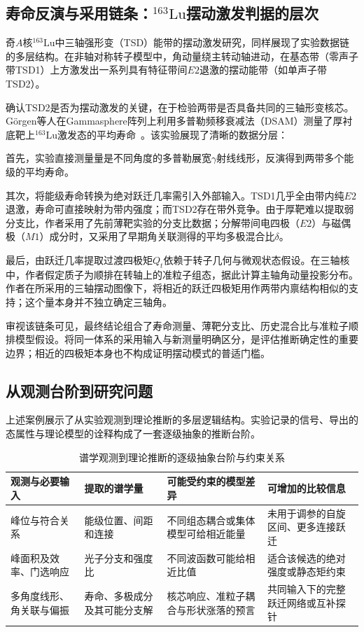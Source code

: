 \subsection{寿命反演与采用链条：\texorpdfstring{$^{163}\mathrm{Lu}$}{163Lu}摆动激发判据的层次}\label{sec:1-1-2}

奇$A$核$^{163}\mathrm{Lu}$中三轴强形变（TSD）能带的摆动激发研究，同样展现了实验数据链的多层结构。在非轴对称转子模型中，角动量绕主转动轴进动，在基态带（零声子带TSD1）上方激发出一系列具有特征带间$E2$退激的摆动能带（如单声子带TSD2）。

确认TSD2是否为摆动激发的关键，在于检验两带是否具备共同的三轴形变核芯。G\"orgen等人在Gammasphere阵列上利用多普勒频移衰减法（DSAM）测量了厚衬底靶上$^{163}\mathrm{Lu}$激发态的平均寿命~\cite{campaign-g07-gorgen-2004-163lu-quadrupole-moments}。该实验展现了清晰的数据分层：

首先，实验直接测量量是不同角度的多普勒展宽$\gamma$射线线形，反演得到两带多个能级的平均寿命。

其次，将能级寿命转换为绝对跃迁几率需引入外部输入。TSD1几乎全由带内纯$E2$退激，寿命可直接映射为带内强度；而TSD2存在带外竞争。由于厚靶难以提取弱分支比，作者采用了先前薄靶实验的分支比数据；分解带间电四极（$E2$）与磁偶极（$M1$）成分时，又采用了早期角关联测得的平均多极混合比$\delta$。

最后，由跃迁几率提取过渡四极矩$Q_t$依赖于转子几何与微观状态假设。在三轴核中，作者假定质子为顺排在转轴上的准粒子组态，据此计算主轴角动量投影分布。作者在所采用的三轴摆动图像下，将相近的跃迁四极矩用作两带内禀结构相似的支持；这个量本身并不独立确定三轴角。

审视该链条可见，最终结论组合了寿命测量、薄靶分支比、历史混合比与准粒子顺排模型假设。将同一体系的采用输入与新测量明确区分，是评估推断确定性的重要边界；相近的四极矩本身也不构成证明摆动模式的普适门槛。

\subsection{从观测台阶到研究问题}\label{sec:1-1-3}

上述案例展示了从实验观测到理论推断的多层逻辑结构。实验记录的信号、导出的态属性与理论模型的诠释构成了一套逐级抽象的推断台阶。

\begin{table}[htbp]
\centering
\small
\caption{谱学观测到理论推断的逐级抽象台阶与约束关系}\label{tab:1-1-inference-hierarchy}
\begin{tabularx}{\textwidth}{p{3.2cm}p{3.2cm}Xp{3.2cm}}
\toprule
观测与必要输入 & 提取的谱学量 & 可能受约束的模型差异 & 可增加的比较信息 \\
\midrule
峰位与符合关系 & 能级位置、间距和连接 & 不同组态耦合或集体模型可给相近能量 & 未用于调参的自旋区间、更多连接跃迁 \\
峰面积及效率、门选响应 & 光子分支和强度比 & 不同波函数可能给相近比值 & 适合该候选的绝对强度或静态矩约束 \\
多角度线形、角关联与偏振 & 寿命、多极成分及其可能分支解 & 核芯响应、准粒子耦合与形状涨落的预言 & 共同输入下的完整跃迁网络或互补探针 \\
\bottomrule
\end{tabularx}
\end{table}

